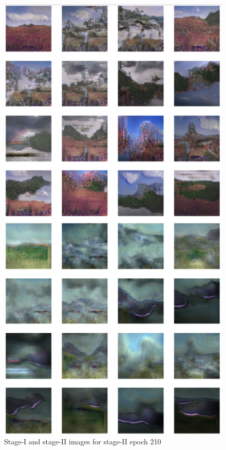 \documentclass{article}
\begin{document}
	\begin{figure}[h]
	\centering
	\includegraphics[scale=0.6]{images/epoch210_FID429.png}
	\caption{Stage-I and stage-II images for stage-II epoch 210}
	\end{figure}
\end{document}
